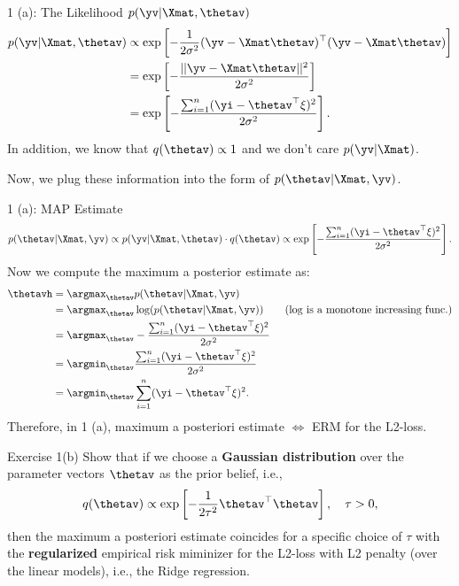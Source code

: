 \documentclass[aspectratio=169]{beamer}
\begin{document}
\begin{frame}{1 (a): The Likelihood $p(\yv | \Xmat, \thetav)$}
	\begin{equation*}
		\begin{aligned}
			p(\yv | \Xmat, \thetav) &\propto \exp \left[ - \frac{1}{2\sigma^2} (\yv - \Xmat\thetav)^\top (\yv - \Xmat \thetav) \right] \\
			&= \exp \left[- \frac{||\yv - \Xmat \thetav||^2}{2 \sigma^2}\right] \\
			&= \exp \left[ -\frac{\sum_{i=1}^n(\yi - \thetav^\top \xi)^2}{2\sigma^2}  \right].
		\end{aligned}
	\end{equation*}
	In addition, we know that $q(\thetav) \propto 1$ and we don't care $p(\yv | \Xmat)$.
	
	Now, we plug these information into the form of $p(\thetav | \Xmat, \yv)$.
\end{frame}

\begin{frame}{1 (a): MAP Estimate}
	\small
	\begin{equation*}
			p(\thetav | \Xmat, \yv) \propto p(\yv | \Xmat, \thetav) \cdot q(\thetav) 
			\propto \exp \left[ -\frac{\sum_{i=1}^n(\yi - \thetav^\top \xi)^2}{2\sigma^2}  \right].
	\end{equation*}
	Now we compute the maximum a posterior estimate as:
	\begin{equation*}
		\begin{aligned}
			\thetavh &= \argmax_{\thetav} p(\thetav | \Xmat, \yv) \\
				&= \argmax_{\thetav} \log (p(\thetav | \Xmat, \yv)) \qquad \text{($\log$ is a monotone increasing func.)} \\
				&= \argmax_{\thetav}  -\frac{\sum_{i=1}^n(\yi - \thetav^\top \xi)^2}{2\sigma^2} \\
				&= \argmin_{\thetav} \frac{\sum_{i=1}^n(\yi - \thetav^\top \xi)^2}{2\sigma^2} \\
				&= \argmin_{\thetav} \sum_{i=1}^n (\yi - \thetav^\top \xi)^2.
		\end{aligned}
	\end{equation*}
Therefore, in 1 (a), maximum a posteriori estimate $\Leftrightarrow$ ERM for the L2-loss.
\end{frame}

\begin{frame}{Exercise 1(b)}
	Show that if we choose a \textbf{Gaussian distribution} over the parameter vectors $\thetav$ as the prior belief, i.e., 
	\begin{equation*}
		q(\thetav) \propto \exp \left[ - \frac{1}{2 \tau^2} \thetav^\top \thetav \right], \quad \tau > 0,
	\end{equation*}
	then the maximum a posteriori estimate coincides for a specific choice of $\tau$ with the \textbf{regularized} empirical risk miminizer for the L2-loss with L2 penalty (over the linear models), i.e., the Ridge regression.
\end{frame}
\end{document}
